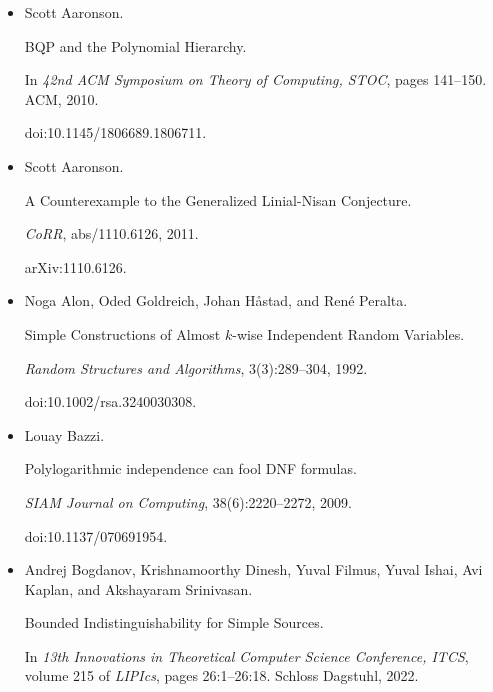 \begin{itemize}


\item[] 
[1]

Scott Aaronson.


BQP and the Polynomial Hierarchy.


In \emph{42nd ACM Symposium on Theory of Computing, STOC}, pages
141–150. ACM, 2010.


doi:10.1145/1806689.1806711.





\item[] 
[2]

Scott Aaronson.


A Counterexample to the Generalized Linial-Nisan
Conjecture.


\emph{CoRR}, abs/1110.6126, 2011.


arXiv:1110.6126.





\item[] 
[3]

Noga Alon, Oded Goldreich, Johan Håstad, and René Peralta.


Simple Constructions of Almost $k$-wise Independent Random
Variables.


\emph{Random Structures and Algorithms}, 3(3):289–304, 1992.


doi:10.1002/rsa.3240030308.





\item[] 
[4]

Louay Bazzi.


Polylogarithmic independence can fool DNF formulas.


\emph{SIAM Journal on Computing}, 38(6):2220–2272, 2009.


doi:10.1137/070691954.





\item[] 
[5]

Andrej Bogdanov, Krishnamoorthy Dinesh, Yuval Filmus, Yuval Ishai, Avi Kaplan,
and Akshayaram Srinivasan.


Bounded Indistinguishability for Simple Sources.


In \emph{13th Innovations in Theoretical Computer Science Conference,
ITCS}, volume 215 of \emph{LIPIcs}, pages 26:1–26:18. Schloss Dagstuhl,
2022.



\end{itemize}
